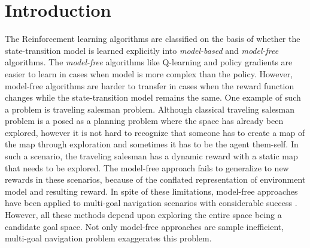 \documentclass[letterpaper]{article} %
\newcommand{\TODO}[1]{{\color{red}TODO: {#1}}}
\begin{document}
\begin{abstract}
\end{abstract}


\section{ Introduction}

The Reinforcement learning algorithms are classified on the basis of whether
the state-transition model is learned explicitly into \emph{model-based}
and \emph{model-free} algorithms.
%
The \emph{model-free} algorithms like Q-learning and policy gradients are easier to learn in cases when model is more complex than the policy.
However, model-free algorithms are harder to transfer in cases when the reward function changes while the state-transition model remains the same.
One example of such a problem is traveling salesman problem.
Although classical traveling salesman problem is a posed as a planning problem where the space has already been explored, however it is not hard to recognize that someone has to create a map of the map through exploration and sometimes it has to be the agent them-self.
In such a scenario, the traveling salesman has a dynamic reward with a static map that needs to be
explored.
The model-free approach fails to generalize to new rewards in these scenarios, because of the conflated representation of environment model and resulting reward.
In spite of these limitations, model-free approaches have been applied to multi-goal navigation
scenarios with considerable success \cite{mirowski2018learning}.
However, all these methods depend upon exploring the entire space being a candidate goal space.
Not only model-free approaches are sample inefficient, multi-goal navigation problem exaggerates this problem.
\end{document}
